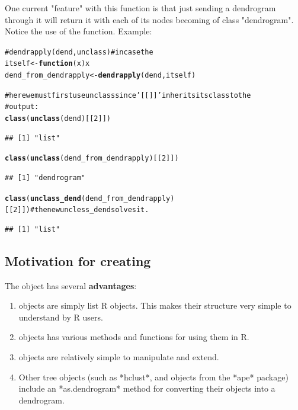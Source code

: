 \documentclass[shortnames,nojss,article]{jss}\usepackage{graphicx, color}
\makeatletter
\newcommand{\hlfunctioncall}[1]{\textcolor[rgb]{0.501960784313725,0,0.329411764705882}{\textbf{#1}}}%
\newcommand{\hlcomment}[1]{\textcolor[rgb]{0.180392156862745,0.6,0.341176470588235}{#1}}%
\newenvironment{kframe}{%
 \def\at@end@of@kframe{}%
 \ifinner\ifhmode%
  \def\at@end@of@kframe{\end{minipage}}%
  \begin{minipage}{\columnwidth}%
 \fi\fi%
 \def\FrameCommand##1{\hskip\@totalleftmargin \hskip-\fboxsep
 \colorbox{shadecolor}{##1}\hskip-\fboxsep
     \hskip-\linewidth \hskip-\@totalleftmargin \hskip\columnwidth}%
 \MakeFramed {\advance\hsize-\width
   \@totalleftmargin\z@ \linewidth\hsize
   \@setminipage}}%
 {\par\unskip\endMakeFramed%
 \at@end@of@kframe}
\newenvironment{knitrout}{}{} %
\makeatother
\begin{document}
One current "feature" with this function is that just sending a dendrogram through it will return it with each of its nodes becoming of class "dendrogram". Notice the use of the  function. Example:

\begin{knitrout}
\color{fgcolor}\begin{kframe}
\begin{alltt}
\hlcomment{# dendrapply(dend, unclass) # in case the}
itself <- \hlfunctioncall{function}(x) x
dend_from_dendrapply <- \hlfunctioncall{dendrapply}(dend, itself)

\hlcomment{# here we must first use unclass since '[[]]' inherits its class to the}
\hlcomment{# output:}
\hlfunctioncall{class}(\hlfunctioncall{unclass}(dend)[[2]])
\end{alltt}
\begin{verbatim}
## [1] "list"
\end{verbatim}
\begin{alltt}
\hlfunctioncall{class}(\hlfunctioncall{unclass}(dend_from_dendrapply)[[2]])
\end{alltt}
\begin{verbatim}
## [1] "dendrogram"
\end{verbatim}
\begin{alltt}
\hlfunctioncall{class}(\hlfunctioncall{unclass_dend}(dend_from_dendrapply)[[2]])  \hlcomment{# the new uncless_dend solves it.}
\end{alltt}
\begin{verbatim}
## [1] "list"
\end{verbatim}
\end{kframe}
\end{knitrout}




\subsection{Motivation for creating }



The  object has several \textbf{advantages}:

\begin{enumerate}
   \item {} objects are simply list R objects. This makes their structure  very simple to understand by R users.
   \item {} objects has various methods and functions for using them in R. 
   \item {} objects are relatively simple to manipulate and extend.
   \item Other tree objects (such as *hclust*, and objects from the *{ape}* package) include an *as.dendrogram* method for converting their objects into a dendrogram.
\end{enumerate}
\end{document}
